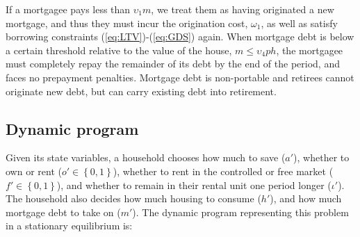 \documentclass[parskip=full]{article}
\begin{document}
\noindent If a mortgagee pays less than $\upsilon_{1}m$, we treat them as having originated a new mortgage, and thus they must incur the origination cost, $\omega_{1}$, as well as satisfy borrowing constraints (\ref{eq:LTV})-(\ref{eq:GDS}) again. When mortgage debt is below a certain threshold relative to the value of the house, $m \leq \upsilon_{4}ph$, the mortgagee must completely repay the remainder of its debt by the end of the period, and faces no prepayment penalties. Mortgage debt is non-portable and retirees cannot originate new debt, but can carry existing debt into retirement. 

\subsection{Dynamic program}\label{subsection:household_optimization}
Given its state variables, a household chooses how much to save ($a'$), whether to own or rent ($o' \in \left\{0,1\right\}$), whether to rent in the controlled or free market ($f' \in \left\{0,1\right\}$), and whether to remain in their rental unit one period longer ($\iota'$). The household also decides how much housing to consume ($h'$), and how much mortgage debt to take on ($m'$). The dynamic program representing this problem in a stationary equilibrium is:
\end{document}
